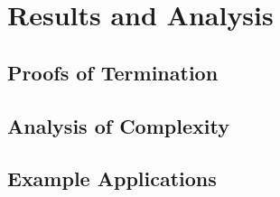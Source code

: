 \documentclass[thesis.tex]{subfiles}
\begin{document}
\chapter{Results and Analysis}

\section{Proofs of Termination}



\section{Analysis of Complexity}


\section{Example Applications}
\end{document}
